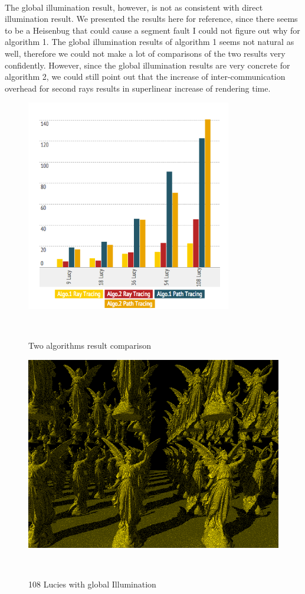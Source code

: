 \documentclass[a4paper, oneside, 10pt]{article}
\begin{document}
\paragraph{}The global illumination result, however, is not as consistent with direct illumination result. We presented the results here for reference, since there seems to be a Heisenbug that could cause a segment fault I could not figure out why for algorithm 1. The global illumination results of algorithm 1 seems not natural as well, therefore we could not make a lot of comparisons of the two results very confidently. However, since the global illumination results are very concrete for algorithm 2, we could still point out that the increase of inter-communication overhead for second rays results in superlinear increase of rendering time.
\begin{figure}[h]
\centering
\includegraphics[width=0.8\textwidth]{res2}
\caption{Two algorithms result comparison}\
\end{figure}
\begin{figure}[h]
\centering
\includegraphics[width=\textwidth]{glucy108}
\caption{108 Lucies with global Illumination}\
\end{figure}
\end{document}
